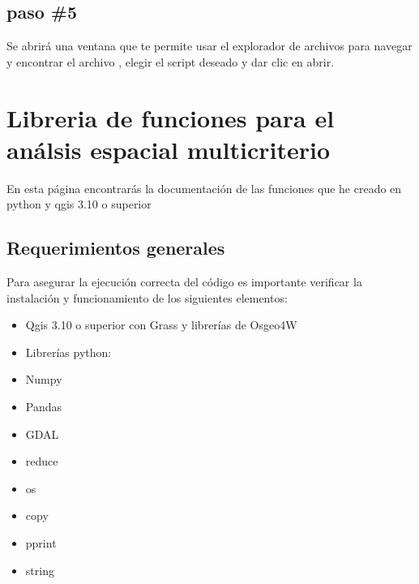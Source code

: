 \documentclass[letterpaper,10pt,spanish]{sphinxmanual}
\begin{document}
\section{paso \#5}
\label{\detokenize{ejecucion:paso-5}}
Se abrirá una ventana que te permite usar el explorador de archivos
para navegar y encontrar el archivo , elegir el script deseado y
dar clic en abrir.

\noindent{}


\chapter{Libreria de funciones para el análsis espacial multicriterio}
\label{\detokenize{apcsig:libreria-de-funciones-para-el-analsis-espacial-multicriterio}}\label{\detokenize{apcsig::doc}}
En esta página encontrarás la documentación de las funciones que he creado en python y qgis 3.10 o superior


\section{Requerimientos generales}
\label{\detokenize{apcsig:requerimientos-generales}}
Para asegurar la ejecución correcta del código es importante
verificar la instalación y funcionamiento de los siguientes elementos:
\begin{itemize}
\item {} 
Qgis 3.10 o superior con Grass y librerías de Osgeo4W

\item {} 
Librerías python:

\end{itemize}
\begin{itemize}
\item {} 
Numpy

\item {} 
Pandas

\item {} 
GDAL

\item {} 
reduce

\item {} 
os

\item {} 
copy

\item {} 
pprint

\item {} 
string

\end{itemize}
\end{document}
